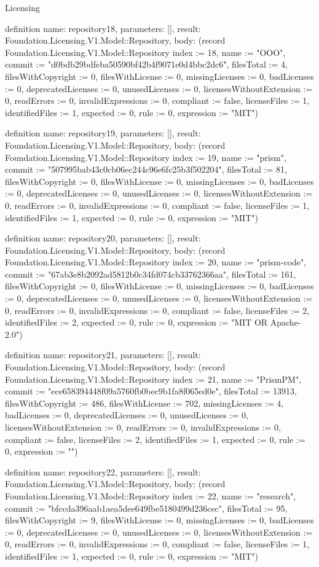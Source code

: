 \begin{lexlean}{Licensing}
\begin{semanticmodule}
definition{
  name: repository18,
  parameters: [],
  result: Foundation.Licensing.V1.Model::Repository,
  body: (record Foundation.Licensing.V1.Model::Repository {index := 18, name := "OOO", commit := "d0bdb29bdfeba50590bf42b4f9071e0d4bbc2dc6", filesTotal := 4, filesWithCopyright := 0, filesWithLicense := 0, missingLicenses := 0, badLicenses := 0, deprecatedLicenses := 0, unusedLicenses := 0, licensesWithoutExtension := 0, readErrors := 0, invalidExpressions := 0, compliant := false, licenseFiles := 1, identifiedFiles := 1, expected := 0, rule := 0, expression := "MIT"})
}

definition{
  name: repository19,
  parameters: [],
  result: Foundation.Licensing.V1.Model::Repository,
  body: (record Foundation.Licensing.V1.Model::Repository {index := 19, name := "prism", commit := "507995bab43c0cb06ec244c96e6fc25b3f502204", filesTotal := 81, filesWithCopyright := 0, filesWithLicense := 0, missingLicenses := 0, badLicenses := 0, deprecatedLicenses := 0, unusedLicenses := 0, licensesWithoutExtension := 0, readErrors := 0, invalidExpressions := 0, compliant := false, licenseFiles := 1, identifiedFiles := 1, expected := 0, rule := 0, expression := "MIT"})
}

definition{
  name: repository20,
  parameters: [],
  result: Foundation.Licensing.V1.Model::Repository,
  body: (record Foundation.Licensing.V1.Model::Repository {index := 20, name := "prism-code", commit := "67ab3e8b2092ad5812b0c34fd074cb33762366aa", filesTotal := 161, filesWithCopyright := 0, filesWithLicense := 0, missingLicenses := 0, badLicenses := 0, deprecatedLicenses := 0, unusedLicenses := 0, licensesWithoutExtension := 0, readErrors := 0, invalidExpressions := 0, compliant := false, licenseFiles := 2, identifiedFiles := 2, expected := 0, rule := 0, expression := "MIT OR Apache-2.0"})
}

definition{
  name: repository21,
  parameters: [],
  result: Foundation.Licensing.V1.Model::Repository,
  body: (record Foundation.Licensing.V1.Model::Repository {index := 21, name := "PrismPM", commit := "ece658394448f09a5760fb0bec9b1fa8f065ed0e", filesTotal := 13913, filesWithCopyright := 486, filesWithLicense := 702, missingLicenses := 4, badLicenses := 0, deprecatedLicenses := 0, unusedLicenses := 0, licensesWithoutExtension := 0, readErrors := 0, invalidExpressions := 0, compliant := false, licenseFiles := 2, identifiedFiles := 1, expected := 0, rule := 0, expression := ""})
}

definition{
  name: repository22,
  parameters: [],
  result: Foundation.Licensing.V1.Model::Repository,
  body: (record Foundation.Licensing.V1.Model::Repository {index := 22, name := "research", commit := "bfccda396aab1aea5dee649fbe5180499d236cec", filesTotal := 95, filesWithCopyright := 9, filesWithLicense := 0, missingLicenses := 0, badLicenses := 0, deprecatedLicenses := 0, unusedLicenses := 0, licensesWithoutExtension := 0, readErrors := 0, invalidExpressions := 0, compliant := false, licenseFiles := 1, identifiedFiles := 1, expected := 0, rule := 0, expression := "MIT"})
}


\end{semanticmodule}
\end{lexlean}

